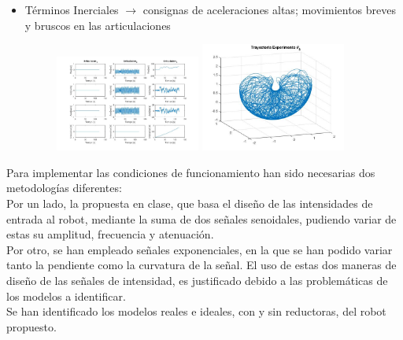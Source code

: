 \begin{itemize}
	\item Términos Inerciales $ \rightarrow $ consignas de aceleraciones altas; movimientos breves y bruscos en las articulaciones

	\begin{figure}[h!]
		\centering
		\includegraphics[width=0.45\textwidth]{graftheta8}
		\includegraphics[width=0.45\textwidth]{Traytheta8}
	\end{figure}

\end{itemize}



Para implementar las condiciones de funcionamiento han sido necesarias dos metodologías diferentes:\\




Por un lado, la propuesta en clase, que basa el diseño de las intensidades de entrada al robot, mediante la suma de dos señales senoidales, pudiendo variar de estas su amplitud, frecuencia y atenuación.\\
Por otro, se han empleado señales exponenciales, en la que se han podido variar tanto la pendiente como la curvatura de la señal.	El uso de estas dos maneras de diseño de las señales de intensidad, es justificado debido a las problemáticas
de los modelos a identificar.\\
Se han identificado los modelos reales e ideales, con y sin reductoras, del robot propuesto.\\

